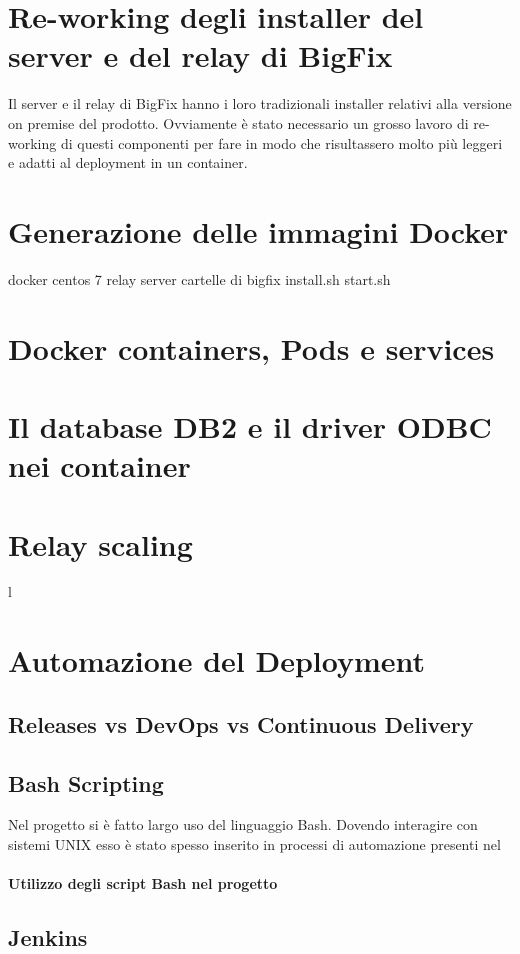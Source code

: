 \section{Re-working degli installer del server e del relay di BigFix}
Il server e il relay di BigFix hanno i loro tradizionali installer relativi alla versione on premise del prodotto. Ovviamente è stato necessario un grosso lavoro di re-working di questi componenti per fare in modo che risultassero molto più leggeri e adatti al deployment in un container.

\section{Generazione delle immagini Docker}
docker centos 7 
relay
server
cartelle di bigfix
install.sh
start.sh

\section{Docker containers, Pods e services}

\section{Il database DB2 e il driver ODBC nei container}

\section{Relay scaling}
l

\section{Automazione del Deployment}
\subsection{Releases vs DevOps vs Continuous Delivery}
\subsection{Bash Scripting}
Nel progetto si è fatto largo uso del linguaggio Bash. Dovendo interagire con sistemi UNIX esso è stato spesso inserito in processi di automazione presenti nel 
\paragraph{Utilizzo degli script Bash nel progetto}
\subsection{Jenkins}
